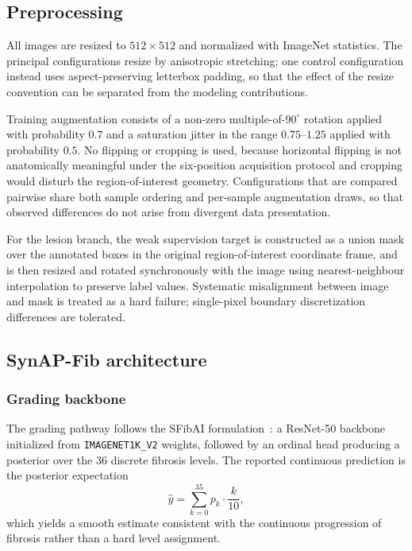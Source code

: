 \subsection{Preprocessing}

All images are resized to $512\times512$ and normalized with ImageNet
statistics. The principal configurations resize by anisotropic stretching; one
control configuration instead uses aspect-preserving letterbox padding, so that
the effect of the resize convention can be separated from the modeling
contributions.

Training augmentation consists of a non-zero multiple-of-$90^\circ$ rotation
applied with probability $0.7$ and a saturation jitter in the range
$0.75$--$1.25$ applied with probability $0.5$. No flipping or cropping is used,
because horizontal flipping is not anatomically meaningful under the six-position
acquisition protocol and cropping would disturb the region-of-interest geometry.
Configurations that are compared pairwise share both sample ordering and
per-sample augmentation draws, so that observed differences do not arise from
divergent data presentation.

For the lesion branch, the weak supervision target is constructed as a union
mask over the annotated boxes in the original region-of-interest coordinate
frame, and is then resized and rotated synchronously with the image using
nearest-neighbour interpolation to preserve label values. Systematic
misalignment between image and mask is treated as a hard failure; single-pixel
boundary discretization differences are tolerated.

\subsection{SynAP-Fib architecture}

\subsubsection{Grading backbone}

The grading pathway follows the SFibAI formulation~\cite{xu2026sfibai}: a
ResNet-50 backbone initialized from \texttt{IMAGENET1K\_V2} weights, followed by
an ordinal head producing a posterior over the 36 discrete fibrosis levels. The
reported continuous prediction is the posterior expectation
\begin{equation}
\hat{y} = \sum_{k=0}^{35} p_k \cdot \frac{k}{10},
\label{eq:score}
\end{equation}
which yields a smooth estimate consistent with the continuous progression of
fibrosis rather than a hard level assignment.

